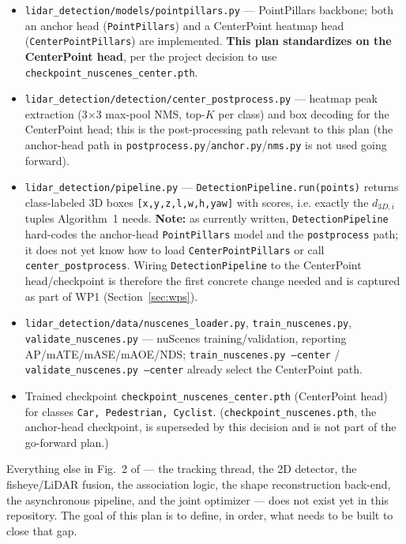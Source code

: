 \documentclass[11pt]{article}
\begin{document}
\begin{itemize}[nosep]
  \item \texttt{lidar\_detection/models/pointpillars.py} --- PointPillars \cite{lang2019pointpillars} backbone; both an anchor head (\texttt{PointPillars}) and a CenterPoint heatmap head \cite{yin2021center} (\texttt{CenterPointPillars}) are implemented. \textbf{This plan standardizes on the CenterPoint head}, per the project decision to use \texttt{checkpoint\_nuscenes\_center.pth}.
  \item \texttt{lidar\_detection/detection/center\_postprocess.py} --- heatmap peak extraction (3$\times$3 max-pool NMS, top-$K$ per class) and box decoding for the CenterPoint head; this is the post-processing path relevant to this plan (the anchor-head path in \texttt{postprocess.py}/\texttt{anchor.py}/\texttt{nms.py} is not used going forward).
  \item \texttt{lidar\_detection/pipeline.py} --- \texttt{DetectionPipeline.run(points)} returns class-labeled 3D boxes \texttt{[x,y,z,l,w,h,yaw]} with scores, i.e. exactly the $d_{3D,i}$ tuples Algorithm~1 needs. \textbf{Note:} as currently written, \texttt{DetectionPipeline} hard-codes the anchor-head \texttt{PointPillars} model and the \texttt{postprocess} path; it does not yet know how to load \texttt{CenterPointPillars} or call \texttt{center\_postprocess}. Wiring \texttt{DetectionPipeline} to the CenterPoint head/checkpoint is therefore the first concrete change needed and is captured as part of WP1 (Section~\ref{sec:wps}).
  \item \texttt{lidar\_detection/data/nuscenes\_loader.py}, \texttt{train\_nuscenes.py}, \texttt{validate\_nuscenes.py} --- nuScenes \cite{caesar2020nuscenes} training/validation, reporting AP/mATE/mASE/mAOE/NDS; \texttt{train\_nuscenes.py --center} / \texttt{validate\_nuscenes.py --center} already select the CenterPoint path.
  \item Trained checkpoint \texttt{checkpoint\_nuscenes\_center.pth} (CenterPoint head) for classes \texttt{Car, Pedestrian, Cyclist}. (\texttt{checkpoint\_nuscenes.pth}, the anchor-head checkpoint, is superseded by this decision and is not part of the go-forward plan.)
\end{itemize}

Everything else in Fig.~2 of \cite{kourani2026dspslampp} --- the tracking thread, the 2D detector, the fisheye/LiDAR fusion, the association logic, the shape reconstruction back-end, the asynchronous pipeline, and the joint optimizer --- does not exist yet in this repository. The goal of this plan is to define, in order, what needs to be built to close that gap.
\end{document}
